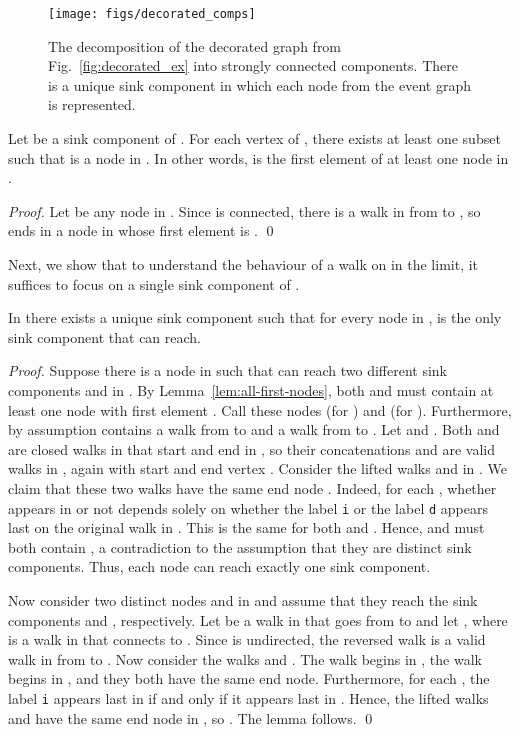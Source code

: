 \documentclass[oribibl,envcountsect,envcountsame]{llncs}
\begin{document}
\begin{figure}
\begin{center}
\texttt{[image: figs/decorated\_comps]}
\end{center}
\caption{The decomposition of the decorated graph from 
  Fig.~\ref{fig:decorated_ex} into strongly connected components.
  There is a unique sink component in which each node from the
  event graph is represented.
}
\label{fig:decorated_comps}
\end{figure}


\begin{lemma}\label{lem:all-first-nodes}
Let  be a sink component of .
For each vertex  of , there exists at least one subset 
such that  is a node  in . In other words,  is the first element
of at least one node in .
\end{lemma}

\begin{proof}
Let  be any node in . Since  is connected, 
there is a walk  in  from
 to , so  ends in a node in  whose first element is
.
\qed\end{proof}


Next, we show that to understand
the  behaviour of a walk on  in the limit, it
suffices to focus on a single sink component of . 


\begin{lemma}\label{lem:uniqueSink}
In  there exists a unique sink component  such that 
for every node  in ,  is the only
sink component that  can reach. 
\end{lemma}

\begin{proof}
Suppose there is a node  in  such that   can reach two 
different sink components  and  in . 
By Lemma~\ref{lem:all-first-nodes},
both  and  must contain at least one node with first
element . Call these nodes  (for ) and
 (for ).
Furthermore, by assumption  contains a walk  from 
 to  and a walk  from 
 to . 
Let  and . Both  and  are
closed walks in  that start and end in ,
so their concatenations  and  are
valid walks in , again with start and end vertex .
Consider the lifted walks 
 and  in
. We claim that these two walks have the same end node . 
Indeed, for each , whether  appears in  or not 
depends solely on whether the label \texttt{i} or the label \texttt{d}
appears last on the original walk in . This is the same
for both  and . Hence,   and  must both contain
, a contradiction to the assumption that they are distinct sink
components. 
Thus, each node  can reach exactly one sink component. 

Now consider two distinct nodes  and 
in  and assume that they reach the sink components  and ,
respectively. Let  be a walk in  that 
goes from   to  and let , where  is 
a walk in  that 
connects  to . Since  is undirected, the reversed walk
 is a valid walk in  from  to . 
Now consider the walks  and . 
The walk  begins in
, the  walk  begins in , and they both have the same end node. 
Furthermore, for each , the label \texttt{i} appears last
in  if and only if it appears last in .
Hence, the lifted walks  and  
have the  same end node in , so .  The lemma
follows.
\qed\end{proof}
\end{document}
